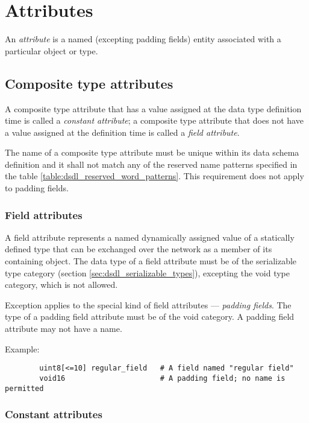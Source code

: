 \section{Attributes}\label{sec:dsdl_attributes}

An \emph{attribute} is a named (excepting padding fields) entity associated with a particular object or type.

\subsection{Composite type attributes}

A composite type attribute that has a value assigned at the data type definition time is called a
\emph{constant attribute};
a composite type attribute that does not have a value assigned at the definition time is called a
\emph{field attribute}.

The name of a composite type attribute must be unique within its data schema definition
and it shall not match any of the reserved name patterns specified in the table
\ref{table:dsdl_reserved_word_patterns}.
This requirement does not apply to padding fields.

\subsubsection{Field attributes}

A field attribute represents a named dynamically assigned value of a statically defined type
that can be exchanged over the network as a member of its containing object.
The data type of a field attribute must be of the serializable type category
(section \ref{sec:dsdl_serializable_types}),
excepting the void type category, which is not allowed.

Exception applies to the special kind of field attributes --- \emph{padding fields}.
The type of a padding field attribute must be of the void category.
A padding field attribute may not have a name.

\begin{remark}
    Example:
    \begin{verbatim}
        uint8[<=10] regular_field   # A field named "regular field"
        void16                      # A padding field; no name is permitted
    \end{verbatim}
\end{remark}

\subsubsection{Constant attributes}

